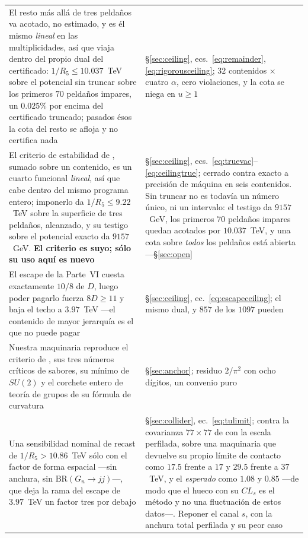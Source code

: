 \documentclass[11pt,a4paper]{article}
\newcommand{\su}[1]{SU(#1)}
\begin{document}
\begin{longtable}{p{}p{}}
El resto más allá de tres peldaños va acotado, no estimado, y es él mismo \emph{lineal} en las
multiplicidades, así que viaja dentro del propio dual del certificado: $1/R_5\le10.037$~TeV sobre el
potencial sin truncar sobre los primeros $70$ peldaños impares, un $0.025\%$ por encima del
certificado truncado; pasados ésos la cota del resto se afloja y no certifica nada & \S\ref{sec:ceiling},
ecs.~\eqref{eq:remainder}, \eqref{eq:rigorousceiling}; $32$ contenidos $\times$ cuatro $\alpha$, cero
violaciones, y la cota se niega en $u\ge1$\\
El criterio de estabilidad de \cite{CCD24}, sumado sobre un contenido, es un cuarto funcional
\emph{lineal}, así que cabe dentro del mismo programa entero; imponerlo da $1/R_5\le9.22$~TeV sobre
la superficie de tres peldaños, alcanzado, y su testigo sobre el potencial exacto da $9157$~GeV.
\textbf{El criterio es suyo; sólo su uso aquí es nuevo} &
\S\ref{sec:ceiling}, ecs.~\eqref{eq:truevac}--\eqref{eq:ceilingtrue}; cerrado contra exacto a
precisión de máquina en seis contenidos. Sin truncar no es todavía un número único, ni un intervalo:
el testigo da $9157$~GeV, los primeros $70$ peldaños impares quedan acotados por $10.037$~TeV, y una
cota sobre \emph{todos} los peldaños está abierta ---\S\ref{sec:open}\\
El escape de la Parte~VI cuesta exactamente $10/8$ de $D$, luego poder pagarlo fuerza $8D\ge11$ y
baja el techo a $3.97$~TeV ---el contenido de mayor jerarquía es el que no puede pagar &
\S\ref{sec:ceiling}, ec.~\eqref{eq:escapeceiling}; el mismo dual, y $857$ de los $1097$ pueden\\
Nuestra maquinaria reproduce el criterio de \cite{vGIQ}, sus tres números críticos de sabores, su
mínimo de $\su2$ y el corchete entero de teoría de grupos de su fórmula de curvatura &
\S\ref{sec:anchor}; residuo $2/\pi^2$ con ocho dígitos, un convenio puro\\
Una sensibilidad nominal de recast de $1/R_5>10.86$~TeV sólo con el factor de forma espacial
---sin anchura, sin $\mathrm{BR}(G_n\to jj)$---, que deja la rama del escape de $3.97$~TeV un
factor tres por debajo & \S\ref{sec:collider}, ec.~\eqref{eq:tulimit}; contra la covarianza
$77\times77$ de \cite{CMSangular} con la escala perfilada, sobre una maquinaria que devuelve su
propio límite de contacto como $17.5$ frente a $17$ y $29.5$ frente a $37$~TeV, y el
\emph{esperado} como $1.08$ y $0.85$ ---de modo que el hueco con su $CL_s$ es el método y no una
fluctuación de estos datos---. Reponer el canal $s$, con la anchura total perfilada y su peor caso

\end{longtable}
\end{document}
